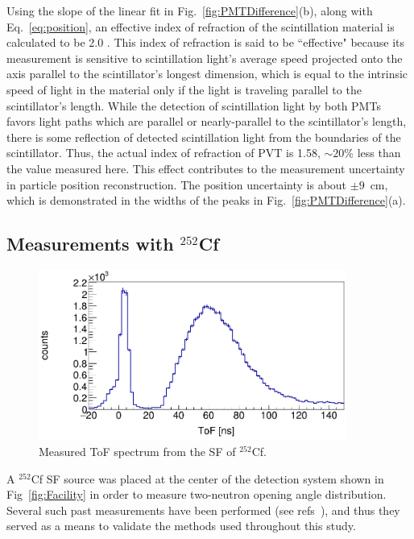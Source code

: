 Using the slope of the linear fit in Fig.~\ref{fig:PMTDifference}(b), along with Eq.~\ref{eq:position}, an effective index of refraction of the scintillation material is calculated to be 2.0 .
This index of refraction is said to be ``effective" because its measurement is sensitive to scintillation light's average speed projected onto the axis parallel to the scintillator's longest dimension, which is equal to the intrinsic speed of light in the material only if the light is traveling parallel to the scintillator's length.
While the detection of scintillation light by both PMTs favors light paths which are parallel or nearly-parallel to the scintillator's length, there is some reflection of detected scintillation light from the boundaries of the scintillator.
Thus, the actual index of refraction of PVT is 1.58, $\sim{20}\%$ less than the value measured here.
This effect contributes to the measurement uncertainty in particle position reconstruction.
The position uncertainty is about $\pm9$~cm, which is demonstrated in the widths of the peaks in Fig.~\ref{fig:PMTDifference}(a).

\subsection{Measurements with $^{252}$Cf}
\begin{figure}[h]
\includegraphics[width=0.9\textwidth]{Content/Methods/Cf252ToF.png}
\caption{Measured ToF spectrum from the SF of $^{252}$Cf.}
\label{fig:Cf252ToF}
\end{figure}
A $^{252}$Cf SF source was placed at the center of the detection system shown in Fig~\ref{fig:Facility} in order to measure two-neutron opening angle distribution.
Several such past measurements have been performed (see refs~\cite{1975Cf252, Pozzi2014, 2008CF252, Verbeke2018}), and thus they served as a means to validate the methods used throughout this study.

